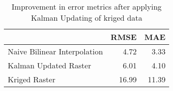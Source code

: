 \begin{table}
\centering
\caption{Improvement in error metrics after applying Kalman Updating of kriged data}
\label{tab:oahu8_gebco_raster_error}
\begin{tabular}{lrr}
\toprule
 & RMSE & MAE \\
\midrule
Naive Bilinear Interpolation & 4.72 & 3.33 \\
Kalman Updated Raster & 6.01 & 4.10 \\
Kriged Raster & 16.99 & 11.39 \\
\bottomrule
\end{tabular}
\end{table}
